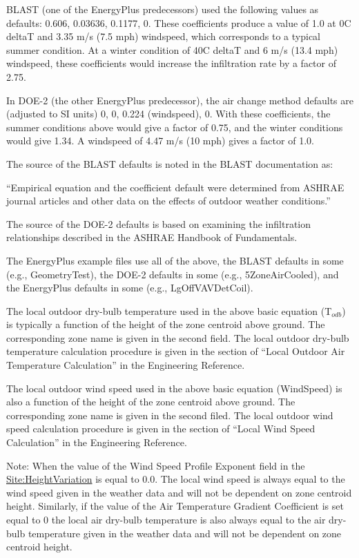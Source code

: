 BLAST (one of the EnergyPlus predecessors) used the following values as defaults: 0.606, 0.03636, 0.1177, 0. These coefficients produce a value of 1.0 at 0C deltaT and 3.35 m/s (7.5 mph) windspeed, which corresponds to a typical summer condition. At a winter condition of 40C deltaT and 6 m/s (13.4 mph) windspeed, these coefficients would increase the infiltration rate by a factor of 2.75.

In DOE-2 (the other EnergyPlus predecessor), the air change method defaults are (adjusted to SI units) 0, 0, 0.224 (windspeed), 0. With these coefficients, the summer conditions above would give a factor of 0.75, and the winter conditions would give 1.34. A windspeed of 4.47 m/s (10 mph) gives a factor of 1.0.

The source of the BLAST defaults is noted in the BLAST documentation as:

``Empirical equation and the coefficient default were determined from ASHRAE journal articles and other data on the effects of outdoor weather conditions.''

The source of the DOE-2 defaults is based on examining the infiltration relationships described in the ASHRAE Handbook of Fundamentals.

The EnergyPlus example files use all of the above, the BLAST defaults in some (e.g., GeometryTest), the DOE-2 defaults in some (e.g., 5ZoneAirCooled), and the EnergyPlus defaults in some (e.g., LgOffVAVDetCoil).

The local outdoor dry-bulb temperature used in the above basic equation (T\(_{odb}\)) is typically a function of the height of the zone centroid above ground. The corresponding zone name is given in the second field. The local outdoor dry-bulb temperature calculation procedure is given in the section of ``Local Outdoor Air Temperature Calculation'' in the Engineering Reference.

The local outdoor wind speed used in the above basic equation (WindSpeed) is also a function of the height of the zone centroid above ground. The corresponding zone name is given in the second filed. The local outdoor wind speed calculation procedure is given in the section of ``Local Wind Speed Calculation'' in the Engineering Reference.

\begin{callout}
  Note: When the value of the Wind Speed Profile Exponent field in the \hyperref[siteheightvariation]{Site:HeightVariation} is equal to 0.0. The local wind speed is always equal to the wind speed given in the weather data and will not be dependent on zone centroid height. Similarly, if the value of the Air Temperature Gradient Coefficient is set equal to 0 the local air dry-bulb temperature is also always equal to the air dry-bulb temperature given in the weather data and will not be dependent on zone centroid height.
\end{callout}

